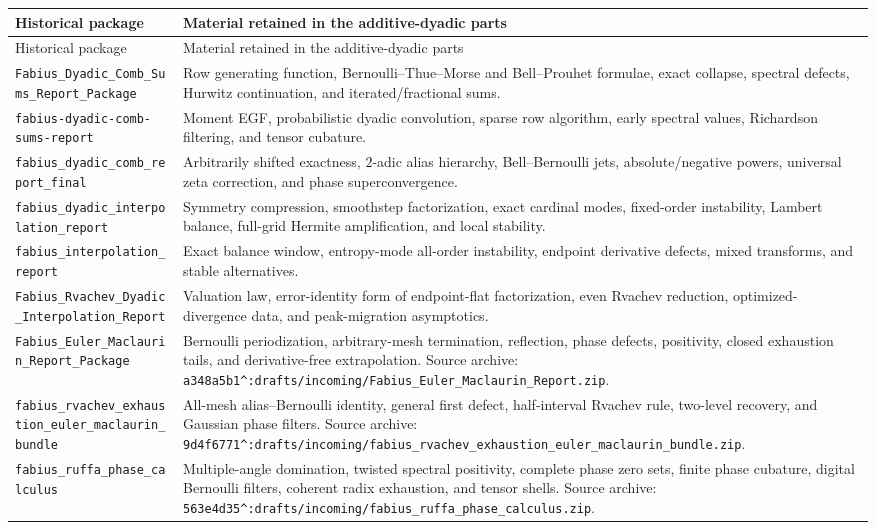 \begin{longtable}{@{}p{}p{}@{}}
\toprule
Historical package & Material retained in the additive-dyadic parts \\
\midrule
\endfirsthead
\toprule
Historical package & Material retained in the additive-dyadic parts \\
\midrule
\endhead
\nolinkurl{Fabius_Dyadic_Comb_Sums_Report_Package} & Row generating function,
Bernoulli--Thue--Morse and Bell--Prouhet formulae, exact collapse, spectral
defects, Hurwitz continuation, and iterated/fractional sums. \\
\addlinespace
\nolinkurl{fabius-dyadic-comb-sums-report} & Moment EGF, probabilistic dyadic
convolution, sparse row algorithm, early spectral values, Richardson filtering,
and tensor cubature. \\
\addlinespace
\nolinkurl{fabius_dyadic_comb_report_final} & Arbitrarily shifted exactness,
$2$-adic alias hierarchy, Bell--Bernoulli jets, absolute/negative powers,
universal zeta correction, and phase superconvergence. \\
\addlinespace
\nolinkurl{fabius_dyadic_interpolation_report} & Symmetry compression,
smoothstep factorization, exact cardinal modes, fixed-order instability,
Lambert balance, full-grid Hermite amplification, and local stability. \\
\addlinespace
\nolinkurl{fabius_interpolation_report} & Exact balance window, entropy-mode
all-order instability, endpoint derivative defects, mixed transforms, and
stable alternatives. \\
\addlinespace
\nolinkurl{Fabius_Rvachev_Dyadic_Interpolation_Report} & Valuation law,
error-identity form of endpoint-flat factorization, even Rvachev reduction,
optimized-divergence data, and peak-migration asymptotics. \\
\addlinespace
\nolinkurl{Fabius_Euler_Maclaurin_Report_Package} & Bernoulli periodization,
arbitrary-mesh termination, reflection, phase defects, positivity, closed
exhaustion tails, and derivative-free extrapolation.  Source archive:
\nolinkurl{a348a5b1^:drafts/incoming/Fabius_Euler_Maclaurin_Report.zip}. \\
\addlinespace
\nolinkurl{fabius_rvachev_exhaustion_euler_maclaurin_bundle} & All-mesh
alias--Bernoulli identity, general first defect, half-interval Rvachev rule,
two-level recovery, and Gaussian phase filters.  Source archive:
\nolinkurl{9d4f6771^:drafts/incoming/fabius_rvachev_exhaustion_euler_maclaurin_bundle.zip}. \\
\addlinespace
\nolinkurl{fabius_ruffa_phase_calculus} & Multiple-angle domination, twisted
spectral positivity, complete phase zero sets, finite phase cubature, digital
Bernoulli filters, coherent radix exhaustion, and tensor shells.  Source
archive: \nolinkurl{563e4d35^:drafts/incoming/fabius_ruffa_phase_calculus.zip}. \\
\bottomrule
\end{longtable}

